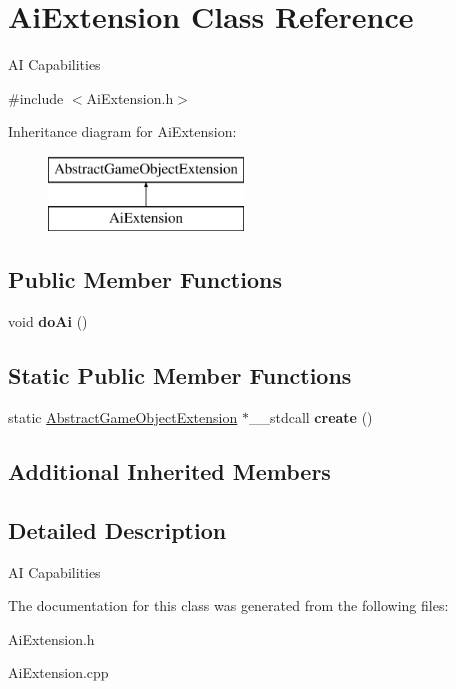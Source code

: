 \hypertarget{class_ai_extension}{}\section{Ai\+Extension Class Reference}
\label{class_ai_extension}


AI Capabilities  




{\ttfamily \#include $<$Ai\+Extension.\+h$>$}

Inheritance diagram for Ai\+Extension\+:\begin{figure}[H]
\begin{center}
\leavevmode
\includegraphics[height=2.000000cm]{class_ai_extension}
\end{center}
\end{figure}
\subsection*{Public Member Functions}
\begin{DoxyCompactItemize}
\item 
\mbox{\label{class_ai_extension_ae409686820de2db2fc0125987500bc71}} 
void {\bfseries do\+Ai} ()
\end{DoxyCompactItemize}
\subsection*{Static Public Member Functions}
\begin{DoxyCompactItemize}
\item 
\mbox{\label{class_ai_extension_ac6134bbf56c9f7bfd1e5707ca05475bf}} 
static \mbox{\hyperlink{class_abstract_game_object_extension}{Abstract\+Game\+Object\+Extension}} $\ast$\+\_\+\+\_\+stdcall {\bfseries create} ()
\end{DoxyCompactItemize}
\subsection*{Additional Inherited Members}


\subsection{Detailed Description}
AI Capabilities 



The documentation for this class was generated from the following files\+:\begin{DoxyCompactItemize}
\item 
Ai\+Extension.\+h\item 
Ai\+Extension.\+cpp\end{DoxyCompactItemize}
